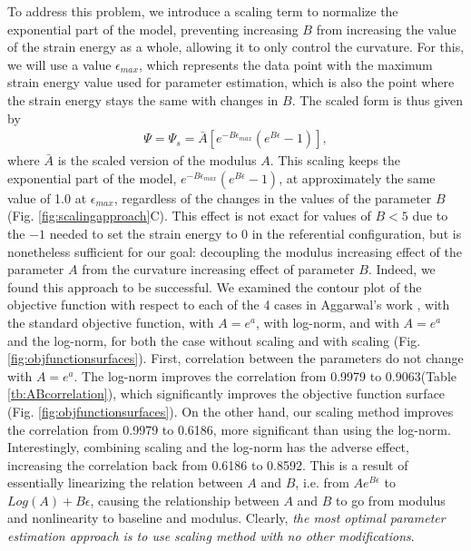 	To address this problem, we introduce a scaling term to normalize the exponential part of the model, preventing increasing $B$ from increasing the value of the strain energy as a whole, allowing it to only control the curvature. For this, we will use a value $\epsilon_{max}$, which represents the data point with the maximum strain energy value used for parameter estimation, which is also the point where the strain energy stays the same with changes in $B$. The scaled form is thus given by
\begin{equation}
\begin{aligned}
\Psi = \Psi_s = \bar{A} \left[e^{-B\epsilon_{max}} \left( e^{B\epsilon} - 1\right)\right],\label{eqn:scaledmodel1D}
\end{aligned}
\end{equation}
where $\bar{A}$ is the scaled version of the modulus $A$. This scaling keeps the exponential part of the model, $e^{-B\epsilon_{max}} ( e^{B\epsilon} - 1)$, at approximately the same value of 1.0 at $\epsilon_{max}$, regardless of the changes in the values of the parameter $B$ (Fig. \ref{fig:scalingapproach}C). This effect is not exact for values of $B < 5$ due to the $-1$ needed to set the strain energy to 0 in the referential configuration, but is nonetheless sufficient for our goal: decoupling the modulus increasing effect of the parameter $A$ from the curvature increasing effect of parameter $B$. Indeed, we found this approach to be successful. We examined the contour plot of the objective function with respect to each of the 4 cases in Aggarwal's work \cite{aggarwal_improved_2017}, with the standard objective function, with $A=e^{a}$, with log-norm, and with $A=e^{a}$ and the log-norm, for both the case without scaling and with scaling (Fig. \ref{fig:objfunctionsurfaces}). First, correlation between the parameters do not change with $A=e^{a}$. The log-norm improves the correlation from 0.9979 to 0.9063(Table \ref{tb:ABcorrelation}), which significantly improves the objective function surface (Fig. \ref{fig:objfunctionsurfaces}). On the other hand, our scaling method improves the correlation from 0.9979 to 0.6186, more significant than using the log-norm. Interestingly, combining scaling and the log-norm has the adverse effect, increasing the correlation back from 0.6186 to 0.8592. This is a result of essentially linearizing the relation between $A$ and $B$, i.e. from $Ae^{B\epsilon}$ to $Log(A)+B\epsilon$, causing the relationship between $A$ and $B$ to go from modulus and nonlinearity to baseline and modulus. Clearly, \emph{the most optimal parameter estimation approach is to use scaling method with no other modifications}. 
    

